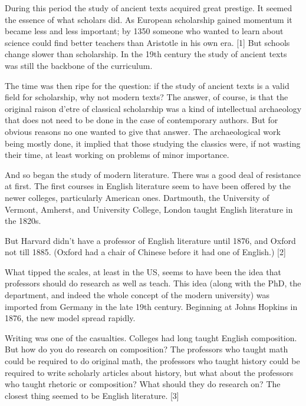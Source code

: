 During this period the
                  study of ancient texts acquired great prestige. It seemed the
                  essence of what scholars did. As European scholarship gained
                  momentum it became less and less important; by 1350 someone
                  who wanted to learn about science could find better teachers
                  than Aristotle in his own era. [1] But schools change slower
                  than scholarship. In the 19th century the study of ancient
                  texts was still the backbone of the curriculum.

The
                  time was then ripe for the question: if the study of ancient
                  texts is a valid field for scholarship, why not modern texts?
                  The answer, of course, is that the original raison d'etre of
                  classical scholarship was a kind of intellectual archaeology
                  that does not need to be done in the case of contemporary
                  authors. But for obvious reasons no one wanted to give that
                  answer. The archaeological work being mostly done, it implied
                  that those studying the classics were, if not wasting their
                  time, at least working on problems of minor importance.

And
                  so began the study of modern literature. There was a good deal
                  of resistance at first. The first courses in English
                  literature seem to have been offered by the newer colleges,
                  particularly American ones. Dartmouth, the University of
                  Vermont, Amherst, and University College, London taught
                  English literature in the 1820s.
                  
                  But Harvard didn't have a professor of English literature
                  until 1876, and Oxford not till 1885. (Oxford had a chair of
                  Chinese before it had one of English.) [2]

What
                  tipped the scales, at least in the US, seems to have been the
                  idea that professors should do research as well as teach. This
                  idea (along with the PhD, the department, and indeed the whole
                  concept of the modern university) was imported from Germany in
                  the late 19th century. Beginning at Johns Hopkins in 1876, the
                  new model spread rapidly.

Writing was one of the
                  casualties. Colleges had long taught English composition. But
                  how do you do research on composition? The professors who
                  taught math could be required to do original math, the
                  professors who taught history could be required to write
                  scholarly articles about history, but what about the
                  professors who taught rhetoric or composition? What should
                  they do research on? The closest thing seemed to be English
                  literature. [3]

